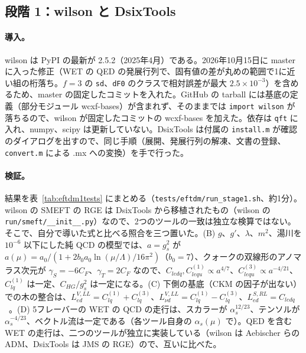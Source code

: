 \documentclass[a4paper,10pt]{ltjsarticle}
\begin{document}
\subsection{段階 1：wilson と DsixTools}\label{sec:eftdm1}

\paragraph{導入。}wilson は PyPI の最新が 2.5.2（2025年4月）である。2026年10月15日に master に入った修正（WET の QED の発展行列で、固有値の差が丸めの範囲で1に近い組の桁落ち。$f=3$ の \texttt{sd}、\texttt{dF0} のクラスで相対誤差が最大 $2.5\times10^{-3}$）を含めるため、master の固定したコミットを入れた。GitHub の tarball には基底の定義（部分モジュール wcxf-bases）が含まれず、そのままでは \texttt{import wilson} が落ちるので、wilson が固定したコミットの wcxf-bases を加えた。依存は \texttt{qft} に入れ、numpy、scipy は更新していない。DsixTools は付属の \texttt{install.m} が確認のダイアログを出すので、同じ手順（展開、発展行列の解凍、文書の登録、\texttt{convert.m} による .mx への変換）を手で行った。

\paragraph{検証。}結果を表~\ref{tab:eftdm1tests} にまとめる（\nolinkurl{tests/eftdm/run_stage1.sh}、約1分）。wilson の SMEFT の RGE は DsixTools から移植されたもの（wilson の \texttt{run/smeft/\_\_init\_\_.py}）なので、2つのツールの一致は独立な検算ではない。そこで、自分で導いた式と比べる照合を三つ置いた。(B) $g$、$g'$、$\lambda$、$m^2$、湯川を $10^{-6}$ 以下にした純 QCD の模型では、$a=g_s^2$ が $a(\mu)=a_0/(1+2b_0a_0\ln(\mu/\Lambda)/16\pi^2)$（$b_0=7$）、クォークの双線形のアノマラス次元が $\gamma_S=-6C_F$、$\gamma_T=2C_F$ なので、$C_{ledq},C_{lequ}^{(1)}\propto a^{4/7}$、$C_{lequ}^{(3)}\propto a^{-4/21}$、$C_{lq}^{(1)}$ は一定、$C_{HG}/g_s^2$ は一定になる。(C) 下側の基底（CKM の因子が出ない）での木の整合は、$L^{V,LL}_{ed}=C_{lq}^{(1)}+C_{lq}^{(3)}$、$L^{V,LL}_{\nu d}=C_{lq}^{(1)}-C_{lq}^{(3)}$、$L^{S,RL}_{ed}=C_{ledq}$~\cite{jms}。(D) 5フレーバーの WET の QCD の走行は、スカラーが $\alpha_s^{12/23}$、テンソルが $\alpha_s^{-4/23}$、ベクトル流は一定である（各ツール自身の $\alpha_s(\mu)$ で）。QED を含む WET の走行は、二つのツールが独立に実装している（wilson は Aebischer らの ADM、DsixTools は JMS の RGE）ので、互いに比べた。
\end{document}
